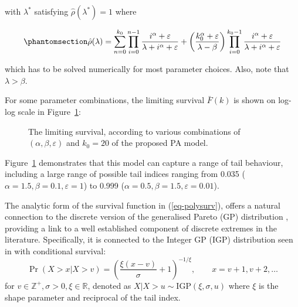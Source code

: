 \documentclass[
  sn-basic,
]{sn-jnl}
\theoremstyle{plain}
\theoremstyle{plain}
\theoremstyle{remark}
\begin{document}
with \(\lambda^*\) satisfying \(\hat \rho(\lambda^*)=1\) where

\begin{equation}\phantomsection\label{eq-rho}{
\hat\rho(\lambda) = \sum_{n=0}^{k_0}\prod_{i=0}^{n-1}\frac{i^\alpha + \varepsilon}{\lambda+i^\alpha + \varepsilon} + \left(\frac{k_0^\alpha + \varepsilon}{\lambda-\beta}\right)\prod_{i=0}^{k_0-1}\frac{i^\alpha + \varepsilon}{\lambda + i^\alpha + \varepsilon} 
}\end{equation}

which has to be solved numerically for most parameter choices. Also,
note that \(\lambda>\beta\).

For some parameter combinations, the limiting survival \(\bar F(k)\) is
shown on log-log scale in Figure~\ref{fig-polylinsurv}:

\begin{figure}


\caption{\label{fig-polylinsurv}The limiting survival, according to
various combinations of \((\alpha, \beta, \varepsilon)\) and \(k_0=20\)
of the proposed PA model.}

\end{figure}%

Figure~\ref{fig-polylinsurv} demonstrates that this model can capture a
range of tail behaviour, including a large range of possible tail
indices ranging from 0.035 (\(\alpha=1.5, \beta=0.1, \varepsilon=1\)) to
0.999 (\(\alpha=0.5, \beta=1.5, \varepsilon=0.01\)).

The analytic form of the survival function in (\ref{eq-polysurv}),
offers a natural connection to the discrete version of the generalised
Pareto (GP) distribution , providing a link to a well established
component of discrete extremes in the literature. Specifically, it is
connected to the Integer GP (IGP) distribution seen in
\citet{Rohrbeck_2018} with conditional survival: \[
\Pr(X> x|X> v) = \left(\frac{\xi(x-v)}{\sigma} + 1\right)^{-1/\xi},\qquad x=v+1,v+2,\ldots
\] for \(v\in\mathbb Z^+, \sigma>0,\xi\in \mathbb R\), denoted as
\(X|X>u \sim  \mathrm {IGP}(\xi, \sigma, u)\) where \(\xi\) is the shape
parameter and reciprocal of the tail index.
\end{document}
